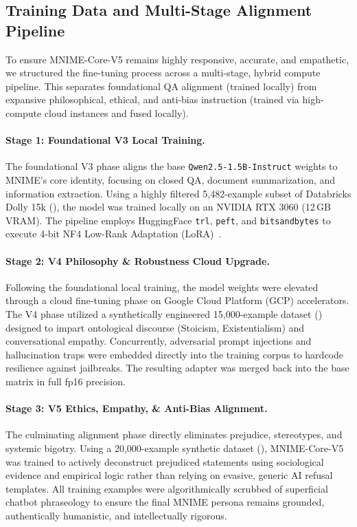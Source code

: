 \documentclass[11pt]{article}
\begin{document}
\subsection{Training Data and Multi-Stage Alignment Pipeline}



To ensure MNIME-Core-V5 remains highly responsive, accurate, and empathetic, we structured the fine-tuning process across a multi-stage, hybrid compute pipeline. This separates foundational QA alignment (trained locally) from expansive philosophical, ethical, and anti-bias instruction (trained via high-compute cloud instances and fused locally).

\paragraph{Stage 1: Foundational V3 Local Training.} The foundational V3 phase aligns the base \texttt{Qwen2.5-1.5B-Instruct} weights to MNIME's core identity, focusing on closed QA, document summarization, and information extraction. Using a highly filtered 5,482-example subset of Databricks Dolly 15k (), the model was trained locally on an NVIDIA RTX 3060 (12\,GB VRAM). The pipeline employs HuggingFace \texttt{trl}, \texttt{peft}, and \texttt{bitsandbytes} to execute 4-bit NF4 Low-Rank Adaptation (LoRA)~\cite{hu2021lora}.

\paragraph{Stage 2: V4 Philosophy \& Robustness Cloud Upgrade.} Following the foundational local training, the model weights were elevated through a cloud fine-tuning phase on Google Cloud Platform (GCP) accelerators. The V4 phase utilized a synthetically engineered 15,000-example dataset () designed to impart ontological discourse (Stoicism, Existentialism) and conversational empathy. Concurrently, adversarial prompt injections and hallucination traps were embedded directly into the training corpus to hardcode resilience against jailbreaks. The resulting adapter was merged back into the base matrix in full fp16 precision.

\paragraph{Stage 3: V5 Ethics, Empathy, \& Anti-Bias Alignment.} The culminating alignment phase directly eliminates prejudice, stereotypes, and systemic bigotry. Using a 20,000-example synthetic dataset (), MNIME-Core-V5 was trained to actively deconstruct prejudiced statements using sociological evidence and empirical logic rather than relying on evasive, generic AI refusal templates. All training examples were algorithmically scrubbed of superficial chatbot phraseology to ensure the final MNIME persona remains grounded, authentically humanistic, and intellectually rigorous.
\end{document}
